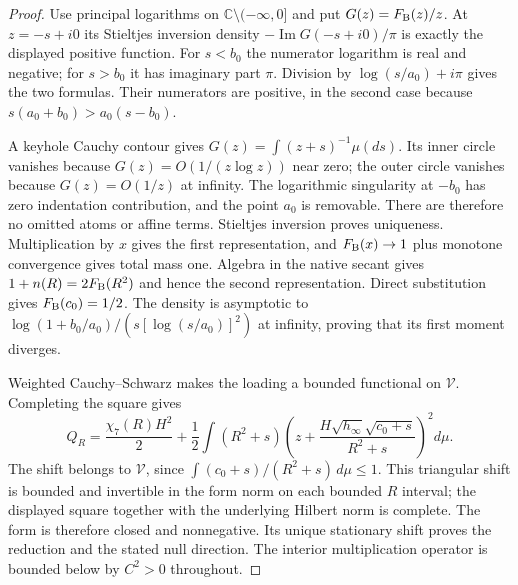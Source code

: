 \documentclass[12pt,a4paper]{article}
\begin{document}
\begin{proof}
Use principal logarithms on $\mathbb C\setminus(-\infty,0]$ and put
$G(z)=F_{\rm B}(z)/z$. At $z=-s+i0$ its Stieltjes inversion density
$-\operatorname{Im}G(-s+i0)/\pi$ is exactly the displayed positive
function. For $s<b_0$ the numerator logarithm is real and negative; for
$s>b_0$ it has imaginary part $\pi$. Division by
$\log(s/a_0)+i\pi$ gives the two formulas. Their numerators are positive,
in the second case because $s(a_0+b_0)>a_0(s-b_0)$.

A keyhole Cauchy contour gives $G(z)=\int(z+s)^{-1}\mu(ds)$.
Its inner circle vanishes because $G(z)=O(1/(z\log z))$ near zero;
the outer circle vanishes because $G(z)=O(1/z)$ at infinity. The
logarithmic singularity at $-b_0$ has zero indentation contribution, and
the point $a_0$ is removable. There are therefore no omitted atoms or
affine terms. Stieltjes inversion proves uniqueness. Multiplication by
$x$ gives the first representation, and $F_{\rm B}(x)\to1$ plus
monotone convergence gives total mass one. Algebra in the native secant
gives $1+n(R)=2F_{\rm B}(R^2)$ and hence the second representation.
Direct substitution gives $F_{\rm B}(c_0)=1/2$. The density is asymptotic
to $\log(1+b_0/a_0)/(s[\log(s/a_0)]^2)$ at infinity, proving that its
first moment diverges.

Weighted Cauchy--Schwarz makes the loading a bounded functional on
$\mathcal V$. Completing the square gives
\[
 Q_R=\frac{\chi_7(R)H^2}{2}
 +\frac12\int(R^2+s)
 \left(z+\frac{H\sqrt{h_\infty}\sqrt{c_0+s}}{R^2+s}\right)^2d\mu.
\]
The shift belongs to $\mathcal V$, since
$\int(c_0+s)/(R^2+s)\,d\mu\le1$. This triangular shift is bounded and
invertible in the form norm on each bounded $R$ interval; the displayed
square together with the underlying Hilbert norm is complete. The form is
therefore closed and nonnegative. Its unique stationary shift proves the
reduction and the stated null direction. The interior multiplication
operator is bounded below by $C^2>0$ throughout.
\end{proof}
\end{document}

